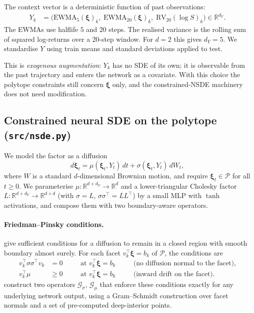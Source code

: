 \documentclass[11pt]{article}
\newcommand{\R}{\mathbb{R}}
\newcommand{\xib}{\boldsymbol{\xi}}
\newcommand{\1}{\mathbf{1}}
\begin{document}
The context vector is a deterministic function of past observations:
\begin{align}
Y_k &= \bigl( \mathrm{EWMA}_5(\xib)_k,\; \mathrm{EWMA}_{20}(\xib)_k,\; \mathrm{RV}_{20}(\log S)_k \bigr) \in \R^{d_Y}.
\end{align}
The EWMAs use halflife $5$ and $20$ steps. The realised variance is the rolling sum of squared log-returns over a 20-step window. For $d = 2$ this gives $d_Y = 5$. We standardise $Y$ using train means and standard deviations applied to test.

This is \emph{exogenous augmentation}: $Y_k$ has no SDE of its own; it is observable from the past trajectory and enters the network as a covariate. With this choice the polytope constraints still concern $\xib$ only, and the constrained-NSDE machinery does not need modification.

\subsection{Constrained neural SDE on the polytope (\texttt{src/nsde.py})}

We model the factor as a diffusion
\begin{equation}
d\xib_t = \mu(\xib_t, Y_t)\, dt + \sigma(\xib_t, Y_t)\, dW_t,
\label{eq:nsde}
\end{equation}
where $W$ is a standard $d$-dimensional Brownian motion, and require $\xib_t \in \mathcal P$ for all $t \ge 0$. We parameterise $\mu : \R^{d+d_Y} \to \R^d$ and a lower-triangular Cholesky factor $L : \R^{d+d_Y} \to \R^{d \times d}$ (with $\sigma = L$, $\sigma\sigma^\top = L L^\top$) by a small MLP with $\tanh$ activations, and compose them with two boundary-aware operators.

\paragraph{Friedman--Pinsky conditions.} \citet{friedman1973} give sufficient conditions for a diffusion to remain in a closed region with smooth boundary almost surely. For each facet $v_k^\top \xib = b_k$ of $\mathcal P$, the conditions are
\begin{align}
v_k^\top \sigma\sigma^\top v_k &= 0 \quad &&\text{at } v_k^\top \xib = b_k \quad &&\text{(no diffusion normal to the facet)},
\label{eq:fp-sigma} \\
v_k^\top \mu &\ge 0 \quad &&\text{at } v_k^\top \xib = b_k \quad &&\text{(inward drift on the facet)}.
\label{eq:fp-mu}
\end{align}
\citet[\S 3]{cohen2021} construct two operators $\mathcal G_\sigma$, $\mathcal G_\mu$ that enforce these conditions exactly for any underlying network output, using a Gram--Schmidt construction over facet normals and a set of pre-computed deep-interior points.
\end{document}
